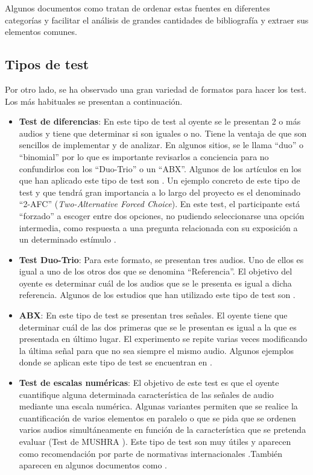 \documentclass[11pt,a4paper]{book}
\begin{document}
            Algunos documentos como \cite{Tejada2020} tratan de ordenar estas fuentes en diferentes categorías y facilitar el análisis de grandes cantidades de bibliografía y extraer sus elementos comunes.
            
        \subsection{Tipos de test}
    		Por otro lado, se ha observado una gran variedad de formatos para hacer los test. Los más habituales se presentan a continuación.
    
    		\begin{itemize}
        		\item \textbf{Test de diferencias}: En este tipo de test al oyente se le presentan 2 o más audios y tiene que determinar si son iguales o no. Tiene la ventaja de que son sencillos de implementar y de analizar. En algunos sitios, se le llama ``duo'' o ``binomial'' por lo que es importante revisarlos a conciencia para no confundirlos con los ``Duo-Trio'' o un ``ABX''. Algunos de los artículos en los que han aplicado este tipo de test son \cite{1995GASoulodre, 1999JBradley,2002PZahorik, 2005IWitew, 2010MVigeant, 2019LKritly}. Un ejemplo concreto de este tipo de test y que tendrá gran importancia a lo largo del proyecto es el denominado ``2-AFC'' (\textit{Two-Alternative Forced Choice}). En este test, el participante está ``forzado'' a escoger entre dos opciones, no pudiendo seleccionarse una opción intermedia, como respuesta a una pregunta relacionada con su exposición a un determinado estímulo \cite{PsychophysicsB}.
        		\item \textbf{Test Duo-Trio}: Para este formato, se presentan tres audios. Uno de ellos es igual a  uno de los otros dos que se denomina ``Referencia''. El objetivo del oyente es determinar cuál de los audios que se le presenta es igual a dicha referencia. Algunos de los estudios que han utilizado este tipo de test son \cite{delaPrida2019, delaPrida2021}.
        		\item \textbf{ABX}: En este tipo de test se presentan tres señales. El oyente tiene que determinar cuál de las dos primeras que se le presentan es igual a la que es presentada en último lugar. El experimento se repite varias veces modificando la última señal para que no sea siempre el mismo audio. Algunos ejemplos donde se aplican este tipo de test se encuentran en \cite{delaPrida2021, Braun2004}.
        		\item \textbf{Test de escalas numéricas}: El objetivo de este test es que el oyente cuantifique alguna determinada característica de las señales de audio mediante una escala numérica. Algunas variantes permiten que se realice la cuantificación de varios elementos en paralelo o que se pida que se ordenen varios audios simultáneamente en función de la característica que se pretenda evaluar (Test de MUSHRA \cite{UIT1534}). Este tipo de test son muy útiles y aparecen como recomendación por parte de normativas internacionales \cite{UIT1116, UIT1284, UIT1534}.También aparecen en algunos documentos como \cite{2011VEmiya,2016BPostma, 2019ZShao,2019GPulvirenti,2019VRajala, 2019JLee, 2019DMorikawa}. 
        		
    		\end{itemize}
\end{document}
